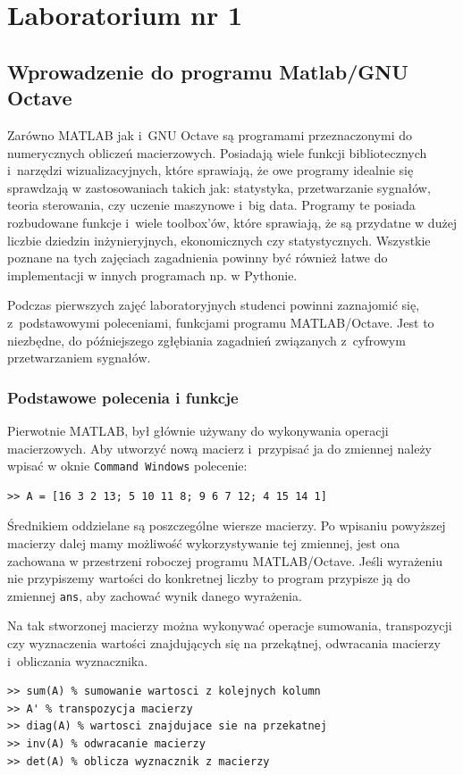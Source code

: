 \section{Laboratorium nr 1}

\subsection{Wprowadzenie do programu Matlab/GNU Octave}

Zarówno MATLAB jak i~GNU Octave są programami przeznaczonymi do numerycznych obliczeń macierzowych. Posiadają wiele funkcji bibliotecznych i~narzędzi wizualizacyjnych, które sprawiają, że owe programy idealnie się sprawdzają w zastosowaniach takich jak: statystyka, przetwarzanie sygnałów, teoria sterowania, czy uczenie maszynowe i~big data. Programy te posiada rozbudowane funkcje i~wiele toolbox'ów, które sprawiają, że są przydatne w dużej liczbie dziedzin inżynieryjnych, ekonomicznych czy statystycznych. Wszystkie poznane na tych zajęciach zagadnienia powinny być również łatwe do implementacji w innych programach np. w Pythonie.

Podczas pierwszych zajęć laboratoryjnych studenci powinni zaznajomić się, z~podstawowymi poleceniami, funkcjami programu MATLAB/Octave. Jest to niezbędne, do późniejszego zgłębiania zagadnień związanych z~cyfrowym przetwarzaniem sygnałów.


\subsubsection{Podstawowe polecenia i funkcje}
Pierwotnie MATLAB, był głównie używany do wykonywania operacji macierzowych. Aby utworzyć nową macierz i~przypisać ja do zmiennej należy wpisać w oknie \texttt{Command Windows} polecenie:
\begin{lstlisting}[caption=Tworzenie macierzy będącej kwadratem magicznym, label=lab1/lst/magicMatrix]
>> A = [16 3 2 13; 5 10 11 8; 9 6 7 12; 4 15 14 1]
\end{lstlisting}
Średnikiem oddzielane są poszczególne wiersze macierzy. Po wpisaniu powyższej macierzy dalej mamy możliwość wykorzystywanie tej zmiennej, jest ona zachowana w przestrzeni roboczej programu MATLAB/Octave. Jeśli wyrażeniu nie przypiszemy wartości do konkretnej liczby to program przypisze ją do zmiennej \texttt{ans}, aby zachować wynik danego wyrażenia. 

Na tak stworzonej macierzy można wykonywać operacje sumowania, transpozycji czy wyznaczenia wartości znajdujących się na przekątnej, odwracania macierzy i~obliczania wyznacznika.
\begin{lstlisting}[caption=Przykładowe funkcje przydatne podczas pracy z macierzami , label=lab1/lst/matrixFunctions]
>> sum(A) % sumowanie wartosci z kolejnych kolumn
>> A' % transpozycja macierzy
>> diag(A) % wartosci znajdujace sie na przekatnej
>> inv(A) % odwracanie macierzy
>> det(A) % oblicza wyznacznik z macierzy
\end{lstlisting}

